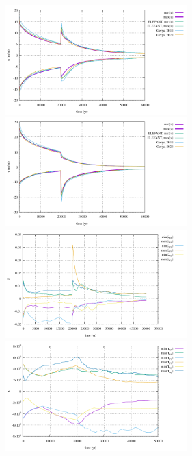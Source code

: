 \begin{center}
\includegraphics[width=7cm]{python_codes/fieldstone_64/results/slab/velocity_u}
\includegraphics[width=7cm]{python_codes/fieldstone_64/results/slab/velocity_v}\\
\includegraphics[width=7cm]{python_codes/fieldstone_64/results/slab/J}
\includegraphics[width=7cm]{python_codes/fieldstone_64/results/slab/tau}
\end{center}


\newpage

